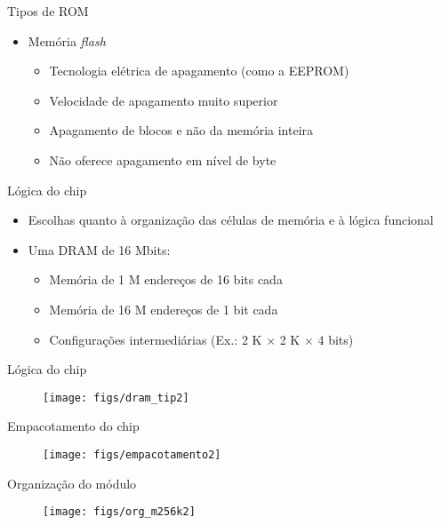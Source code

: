 \begin{slide}{Tipos de ROM}
\begin{itemize}
   \item Memória \textit{flash}
   \begin{itemize}
      \item Tecnologia elétrica de apagamento (como a EEPROM)
      \item Velocidade de apagamento muito superior
      \item Apagamento de blocos e não da memória inteira
      \item Não oferece apagamento em nível de byte
   \end{itemize}
\end{itemize}
\end{slide}

\begin{slide}{Lógica do chip}
\begin{itemize}
   \item Escolhas quanto à organização das células de memória e  à lógica funcional \pause
   \item Uma DRAM de 16 Mbits: \pause
   \begin{itemize}
      \item Memória de 1 M endereços de 16 bits cada\pause
      \item Memória de 16 M endereços de 1 bit cada\pause
      \item Configurações intermediárias (Ex.: 2 K $\times$ 2 K $\times$ 4 bits)
   \end{itemize}
\end{itemize}
\end{slide}

\begin{slide}{Lógica do chip}
\begin{figure}[h]
         \centering
         \texttt{[image: figs/dram\_tip2]}
      \end{figure}
\end{slide}

\begin{slide}{Empacotamento do chip}
\begin{figure}[h]
         \centering
         \texttt{[image: figs/empacotamento2]}
      \end{figure}
\end{slide}

\begin{slide}{Organização do módulo}
\begin{figure}[h]
         \centering
         \texttt{[image: figs/org\_m256k2]}
      \end{figure}
\end{slide}

